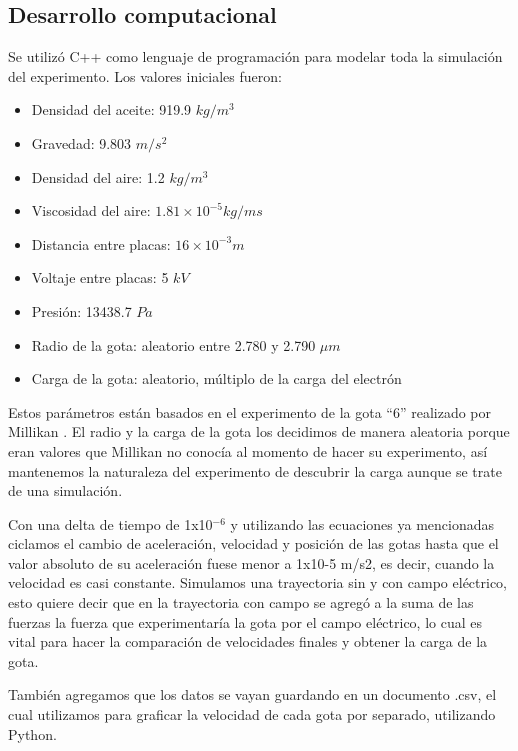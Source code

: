 \documentclass[
 reprint,
 amsmath,amssymb,
 aps,
]{revtex4-2}
\begin{document}
\subsection{Desarrollo computacional}

Se utiliz\'o C++ como lenguaje de programaci\'on para modelar toda la simulaci\'on del experimento. Los valores iniciales fueron:

\begin{itemize}
    \item Densidad del aceite: 919.9 $kg/m^3$
    \item Gravedad: 9.803 $m/s^2$
    \item Densidad del aire: 1.2 $kg/m^3$
    \item Viscosidad del aire: $1.81\times10^{-5} kg/ms$
    \item Distancia entre placas: $16\times10^{-3}m$
    \item Voltaje entre placas: 5 $kV$
    \item Presi\'on: 13438.7 $Pa$
    \item Radio de la gota: aleatorio entre 2.780 y 2.790 $\mu m$
    \item Carga de la gota: aleatorio, m\'ultiplo de la carga del electr\'on
\end{itemize}

Estos parámetros están basados en el experimento de la gota “6” realizado por Millikan \cite{Millikan1912} \cite{Oxford}. El radio y la carga de la gota los decidimos de manera aleatoria porque eran valores que Millikan no conocía al momento de hacer su experimento, así mantenemos la naturaleza del experimento de descubrir la carga aunque se trate de una simulación.

Con una delta de tiempo de 1x10$^{-6}$ y utilizando las ecuaciones ya mencionadas ciclamos el cambio de aceleración, velocidad y posición de las gotas hasta que el valor absoluto de su aceleración fuese menor a 1x10-5 m/s2, es decir, cuando la velocidad es casi constante. Simulamos una trayectoria sin y con campo eléctrico, esto quiere decir que en la trayectoria con campo se agregó a la suma de las fuerzas la fuerza que experimentaría la gota por el campo eléctrico, lo cual es vital para hacer la comparación de velocidades finales y obtener la carga de la gota. 

También agregamos que los datos se vayan guardando en un documento .csv, el cual utilizamos para graficar la velocidad de cada gota por separado, utilizando Python.
\end{document}
